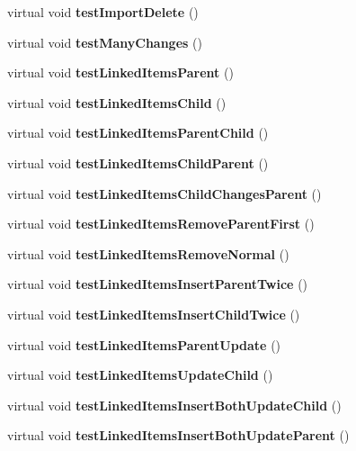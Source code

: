 \begin{CompactItemize}
\item 
virtual void \textbf{test\-Import\-Delete} ()\label{group__ClientTest_g1f87c00619bf71f26ae9a7a35e410803}

\item 
virtual void \textbf{test\-Many\-Changes} ()\label{group__ClientTest_gc79d3081b27df1fd5c12070a23f7dc0f}

\item 
virtual void \textbf{test\-Linked\-Items\-Parent} ()\label{group__ClientTest_g8265afa4aecbf4e83018e0f548240f78}

\item 
virtual void \textbf{test\-Linked\-Items\-Child} ()\label{group__ClientTest_g3a1ceae09c7df3f02f6f53eb881cb6c6}

\item 
virtual void \textbf{test\-Linked\-Items\-Parent\-Child} ()\label{group__ClientTest_g354b51e8adb792f812f055833f19d646}

\item 
virtual void \textbf{test\-Linked\-Items\-Child\-Parent} ()\label{group__ClientTest_g4584aad53aa76ed65407f11b688728bf}

\item 
virtual void \textbf{test\-Linked\-Items\-Child\-Changes\-Parent} ()\label{group__ClientTest_g4fb2e1ea39ad207556b9ce3e2f2de7a1}

\item 
virtual void \textbf{test\-Linked\-Items\-Remove\-Parent\-First} ()\label{group__ClientTest_g45620d674aa31cc534509c7064da284d}

\item 
virtual void \textbf{test\-Linked\-Items\-Remove\-Normal} ()\label{group__ClientTest_g9ddb7acaef74dbb7bc27422c5b74181f}

\item 
virtual void \textbf{test\-Linked\-Items\-Insert\-Parent\-Twice} ()\label{group__ClientTest_g2e2b4217c211ea719388105619d45a60}

\item 
virtual void \textbf{test\-Linked\-Items\-Insert\-Child\-Twice} ()\label{group__ClientTest_g6ee12660ef78fad16d27748ff20d8183}

\item 
virtual void \textbf{test\-Linked\-Items\-Parent\-Update} ()\label{group__ClientTest_ge05a18788fbdd8360b4a10721036beb7}

\item 
virtual void \textbf{test\-Linked\-Items\-Update\-Child} ()\label{group__ClientTest_g530727d8122c69b8008be62652af7755}

\item 
virtual void \textbf{test\-Linked\-Items\-Insert\-Both\-Update\-Child} ()\label{group__ClientTest_g5d0e06ba1cac19805ec0d7d0dfbe21e7}

\item 
virtual void \textbf{test\-Linked\-Items\-Insert\-Both\-Update\-Parent} ()\label{group__ClientTest_g7eab80ca6d905dffba6552f8a965fe1d}

\end{CompactItemize}
